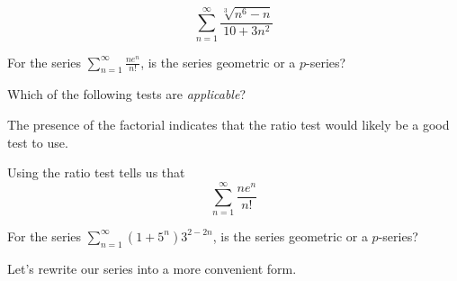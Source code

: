 \documentclass{ximera}
\begin{document}
\begin{exercise}
\begin{hint}
\begin{question}
\[
\sum_{n=1}^{\infty}\frac{\sqrt[3]{n^6-n}}{10+3n^2}
\]

\begin{multipleChoice}
\end{multipleChoice}


\end{question}

\begin{question}
For the series  $\sum_{n=1}^{\infty} \frac{ne^n}{n!}$, is the series geometric or a $p$-series?

\begin{multipleChoice}
\end{multipleChoice}


 Which of the following tests are \emph{applicable}?

\begin{selectAll}
\end{selectAll}


The presence of the factorial indicates that the ratio test would likely be a good test to use. 

Using the ratio test tells us that 
\[
\sum_{n=1}^{\infty} \frac{ne^n}{n!}
\]

\begin{multipleChoice}
\end{multipleChoice}

\end{question}

\begin{question}

For the series $\sum_{n=1}^{\infty}(1+5^n)3^{2-2n}$, is the series geometric or a $p$-series?

\begin{multipleChoice}
\end{multipleChoice}

Let's rewrite our series into a more convenient form. 


\end{question}
\end{hint}
\end{exercise}
\end{document}
